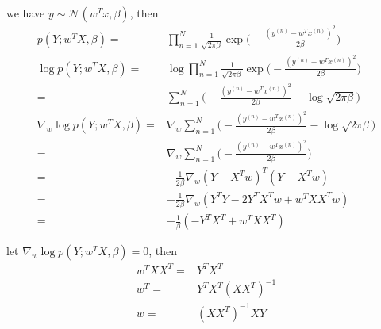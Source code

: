 \documentclass[../main.tex]{subfiles}
\begin{document}
we have $y \sim \mathcal{N}(w^Tx, \beta)$, then
\begin{align*}
    p(Y; w^TX, \beta)
    = & \prod^N_{n=1} \frac{1}{\sqrt{2\pi\beta}}
        \exp\big( - \frac{(y^{(n)} - w^T x^{(n)})^2}{2\beta} \big) \\
    \log p(Y; w^TX, \beta)
    = & \log \prod^N_{n=1} \frac{1}{\sqrt{2\pi\beta}}
        \exp\big( - \frac{(y^{(n)} - w^T x^{(n)})^2}{2\beta} \big) \\
    = & \sum^N_{n=1} \big(
        - \frac{(y^{(n)} - w^T x^{(n)})^2}{2 \beta}
        - \log \sqrt{2 \pi \beta} \big) \\
    \nabla_w \log p(Y; w^TX, \beta)
    = & \nabla_w \sum^N_{n=1} \big(
        - \frac{(y^{(n)} - w^T x^{(n)})^2}{2 \beta}
        - \log \sqrt{2 \pi \beta} \big) \\
    = & \nabla_w \sum^N_{n=1} \big(
        - \frac{(y^{(n)} - w^T x^{(n)})^2}{2 \beta}
        \big) \\
    = & - \frac{1}{2\beta} \nabla_w 
        (Y - X^T w)^T(Y - X^T w) \\
    = & - \frac{1}{2 \beta} \nabla_w
        (Y^TY - 2 Y^TX^Tw + w^TXX^Tw) \\
    = & - \frac{1}{\beta} (- Y^TX^T + w^TXX^T)
\end{align*}

let $\nabla_w \log p(Y; w^TX, \beta) = 0$, then
\begin{align*}
    w^TXX^T = & Y^TX^T \\
    w^T = & Y^TX^T(XX^T)^{-1} \\
    w = & (XX^T)^{-1}XY
\end{align*}
\end{document}
